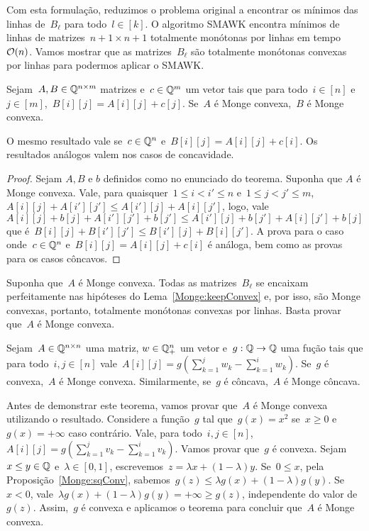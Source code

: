 Com esta formulação, reduzimos o problema original a encontrar os mínimos das linhas de~$B_\ell$ para todo~$l \in [k]$. O algoritmo SMAWK encontra mínimos de linhas de matrizes~$n+1 \times n+1$ totalmente monótonas por linhas em tempo~$\mathcal{O}(n)$. Vamos mostrar que as matrizes~$B_\ell$ são totalmente monótonas convexas por linhas para podermos aplicar o SMAWK.

\begin{lema} \label{Monge:keepConvex}
Sejam~$A,B \in \mathbb{Q}^{n \times m}$ matrizes e~$c \in \mathbb{Q}^m$ um vetor tais que para todo~$i \in [n]$ e~$j \in [m]$,~${B[i][j] = A[i][j] + c[j]}$. Se~$A$ é Monge convexa,~$B$ é Monge convexa.  

O mesmo resultado vale se~$c \in \mathbb{Q}^n$ e~${B[i][j] = A[i][j] + c[i]}$. Os resultados análogos valem nos casos de concavidade.
\end{lema}

\begin{proof}
Sejam $A,B$ e $b$ definidos como no enunciado do teorema. Suponha que $A$ é Monge convexa. Vale, para quaisquer~${1 \leq i < i' \leq n}$ e~${1 \leq j < j' \leq m}$,~${A[i][j] + A[i'][j'] \leq A[i'][j] + A[i][j']}$, logo, vale~${A[i][j] + b[j] + A[i'][j'] + b[j'] \leq A[i'][j] + b[j'] + A[i][j'] + b[j]}$ que é~${B[i][j] + B[i'][j'] \leq B[i'][j] + B[i][j']}$. A prova para o caso onde~$c \in \mathbb{Q}^n$ e~${B[i][j] = A[i][j] + c[i]}$ é análoga, bem como as provas para os casos côncavos.
\end{proof}

Suponha que~$A$ é Monge convexa. Todas as matrizes~$B_\ell$ se encaixam perfeitamente nas hipóteses do Lema~\ref{Monge:keepConvex} e, por isso, são Monge convexas, portanto, totalmente monótonas convexas por linhas. Basta provar que~$A$ é Monge convexa.

\begin{theo} \label{theo:MongeConvex_and_Convex}
Sejam~$A \in \mathbb{Q}^{n \times n}$ uma matriz, $w \in \mathbb{Q}_+^n$ um vetor e~${g : \mathbb{Q} \to \mathbb{Q}}$ uma fução tais que para todo~$i,j \in [n]$ vale~${A[i][j] = g\left(\sum\limits_{k=1}^j w_k - \sum\limits_{k=1}^i w_k\right)}$. Se~$g$ é convexa,~$A$ é Monge convexa. Similarmente, se~$g$ é côncava,~$A$ é Monge côncava.
\end{theo}

Antes de demonstrar este teorema, vamos provar que~$A$ é Monge convexa utilizando o resultado. Considere a função~$g$ tal que~$g(x) = x^2$ se~$x \geq 0$ e~$g(x) = +\infty$ caso contrário. Vale, para todo~$i,j \in [n]$,~${A[i][j] = g\left(\sum\limits_{k=1}^j v_k - \sum\limits_{k=1}^i v_k \right)}$. Vamos provar que~$g$ é convexa. Sejam~$x \leq y \in \mathbb{Q}$ e~$\lambda \in [0,1]$, escrevemos~$z = \lambda x + (1-\lambda)y$. Se~$0 \leq x$, pela Proposição~\ref{Monge:sqConv}, sabemos~$g(z) \leq \lambda g(x) + (1-\lambda) g(y)$. Se~$x < 0$, vale~$\lambda g(x) + (1-\lambda)g(y) = +\infty \geq g(z)$, independente do valor de~$g(z)$. Assim,~$g$ é convexa e aplicamos o teorema para concluir que~$A$ é Monge convexa.

